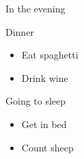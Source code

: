 \documentclass[
  ignorenonframetext,
]{beamer}
\providecommand{\tightlist}{%
  \setlength{\itemsep}{0pt}\setlength{\parskip}{0pt}}\usepackage{longtable,booktabs,array}
\begin{document}
\begin{frame}{In the evening}
\label{in-the-evening}
\begin{block}{Dinner}
\label{dinner}
\begin{itemize}
\tightlist
\item
  Eat spaghetti
\item
  Drink wine
\end{itemize}
\end{block}

\begin{block}{Going to sleep}
\label{going-to-sleep}
\begin{itemize}
\tightlist
\item
  Get in bed
\item
  Count sheep
\end{itemize}
\end{block}
\end{frame}
\end{document}
